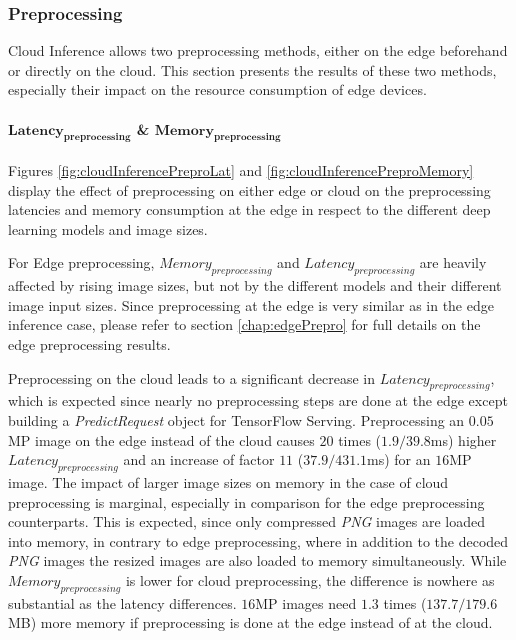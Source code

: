 \subsubsection{Preprocessing}
Cloud Inference allows two preprocessing methods, either on the edge beforehand or directly on the cloud.
This section presents the results of these two methods, especially their impact on the resource consumption of edge devices.

\paragraph{$\mathbf{Latency_{preprocessing}}$ \& $\mathbf{Memory_{preprocessing}}$}
Figures \ref{fig:cloudInferencePreproLat} and \ref{fig:cloudInferencePreproMemory} display the effect of preprocessing on either edge or cloud on the preprocessing latencies and memory consumption at the edge in respect to the different deep learning models and image sizes.

For Edge preprocessing, $Memory_{preprocessing}$ and $Latency_{preprocessing}$ are heavily affected by rising image sizes, but not by the different models and their different image input sizes.
Since preprocessing at the edge is very similar as in the edge inference case, please refer to section \ref{chap:edgePrepro} for full details on the edge preprocessing results.

Preprocessing on the cloud leads to a significant decrease in $Latency_{preprocessing}$, which is expected since nearly no preprocessing steps are done at the edge except building a \emph{PredictRequest} object for TensorFlow Serving.
Preprocessing an $0.05$MP image on the edge instead of the cloud causes $20$ times ($1.9/39.8$ms) higher $Latency_{preprocessing}$ and an increase of factor $11$ ($37.9/431.1$ms) for an $16$MP image.
The impact of larger image sizes on memory in the case of cloud preprocessing is marginal, especially in comparison for the edge preprocessing counterparts. This is expected, since only compressed \emph{PNG} images are loaded into memory, in contrary to edge preprocessing, where in addition to the decoded \emph{PNG} images the resized images are also loaded to memory simultaneously.
While $Memory_{preprocessing}$ is lower for cloud preprocessing, the difference is nowhere as substantial as the latency differences. $16$MP images need $1.3$ times ($137.7/179.6$MB) more memory if preprocessing is done at  the edge instead of at the cloud.

